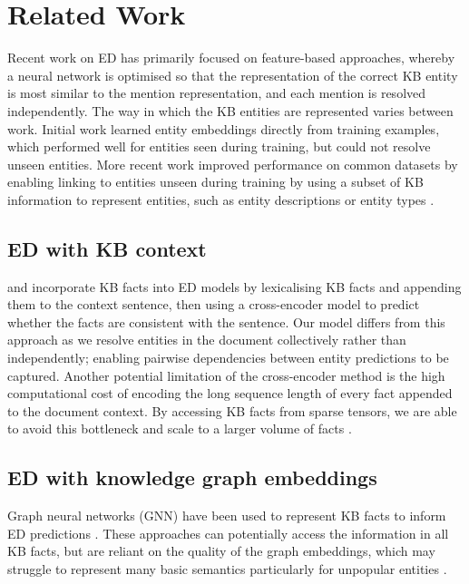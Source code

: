 \documentclass[11pt]{article}
\begin{document}
\section{Related Work}
Recent work on ED has primarily focused on feature-based approaches, whereby a neural network is optimised so that the representation of the correct KB entity is most similar to the mention representation, and each mention is resolved independently. The way in which the KB entities are represented varies between work. Initial work \cite{ganea-hofmann-2017-deep} learned entity embeddings directly from training examples, which performed well for entities seen during training, but could not resolve unseen entities. More recent work improved performance on common datasets by enabling linking to entities unseen during training by using a subset of KB information to represent entities, such as entity descriptions \cite{logeswaran-etal-2019-zero, wu-etal-2020-scalable} or entity types \cite{Raiman2018DeepTypeME, DBLP:conf/aaai/OnoeD20}. 




\subsection{ED with KB context}
\citet{mulang} and \citet{triplesastext} incorporate KB facts into ED models by lexicalising KB facts and appending them to the context sentence, then using a cross-encoder model to predict whether the facts are consistent with the sentence. Our model differs from this approach as we resolve entities in the document collectively rather than independently; enabling pairwise dependencies between entity predictions to be captured. Another potential limitation of the cross-encoder method is the high computational cost of encoding the long sequence length of every fact appended to the document context.
By accessing KB facts from sparse tensors, we are able to avoid this bottleneck and scale to a larger volume of facts \cite{Cohen2020Scalable}.


\subsection{ED with knowledge graph embeddings}
Graph neural networks (GNN) have been used to represent KB facts to inform ED predictions \cite{sevgili-etal-2019-improving, Ma2021-dg}. These approaches can potentially access the information in all KB facts, but are reliant on the quality of the graph embeddings, which may struggle to represent many basic semantics \cite{kgearebad} particularly for unpopular entities \cite{unpopularkge}. 
\end{document}
